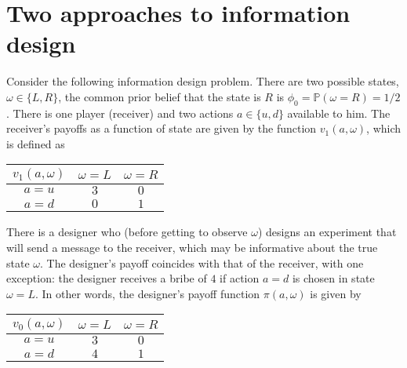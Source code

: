 \documentclass[a4paper]{article}
\begin{document}
\section{Two approaches to information design}
	
	Consider the following information design problem. There are two possible states, $\omega \in \{L,R\}$, the common prior belief that the state is $R$ is $\phi_0 = \mathbb{P}(\omega = R) = 1/2$. There is one player (receiver) and two actions $a \in \{u,d\}$ available to him. The receiver's payoffs as a function of state are given by the function $v_1(a,\omega)$, which is defined as
	\begin{center}
		\begin{tabular}{c | c | c |}
			$v_1(a,\omega)$ 		& $\omega = L$ 	& $\omega = R$ \\ \hline
			$a=u$	& $3$ 	& $0$	\\ \hline
			$a=d$	& $0$ 	& $1$	\\ \hline
		\end{tabular}
	\end{center}
	There is a designer who (before getting to observe $\omega$) designs an experiment that will send a message to the receiver, which may be informative about the true state $\omega$. The designer's payoff coincides with that of the receiver, with one exception: the designer receives a bribe of $4$ if action $a=d$ is chosen in state $\omega=L$. In other words, the designer's payoff function $\pi(a,\omega)$ is given by
	\begin{center}
		\begin{tabular}{c | c | c |}
			$v_0(a,\omega)$ 		& $\omega = L$ 	& $\omega = R$ \\ \hline
			$a=u$	& $3$ 	& $0$	\\ \hline
			$a=d$	& $4$ 	& $1$	\\ \hline
		\end{tabular}
	\end{center}
	
\end{document}
